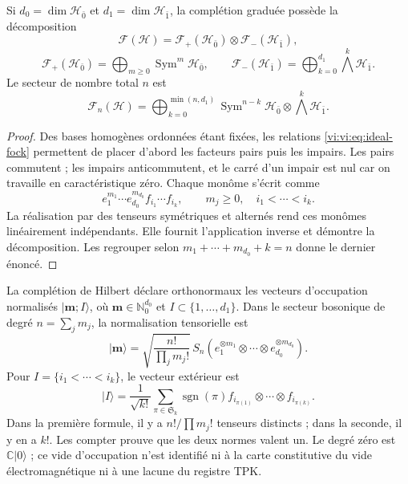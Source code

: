 \begin{theorem}
\label{vi:vi:thm:fock-graduado}
Si \(d_0=\dim\mathcal H_{\bar0}\) et
\(d_1=\dim\mathcal H_{\bar1}\), la complétion graduée possède
la décomposition
\begin{equation}
 \mathcal F(\mathcal H)=
 \mathcal F_+(\mathcal H_{\bar0})\otimes
 \mathcal F_-(\mathcal H_{\bar1}),
 \label{vi:vi:eq:fock-producto}
\end{equation}
\[
 \mathcal F_+(\mathcal H_{\bar0})=
 \bigoplus_{m\ge0}\operatorname{Sym}^m\mathcal H_{\bar0},
 \qquad
 \mathcal F_-(\mathcal H_{\bar1})=
 \bigoplus_{k=0}^{d_1}\bigwedge^k\mathcal H_{\bar1}.
\]
Le secteur de nombre total \(n\) est
\[
 \mathcal F_n(\mathcal H)=
 \bigoplus_{k=0}^{\min(n,d_1)}
 \operatorname{Sym}^{n-k}\mathcal H_{\bar0}
 \otimes\bigwedge^k\mathcal H_{\bar1}.
\]
\end{theorem}
\begin{proof}
Des bases homogènes ordonnées étant fixées, les relations
\eqref{vi:vi:eq:ideal-fock} permettent de placer d’abord les facteurs pairs
puis les impairs. Les pairs commutent ; les impairs anticommutent,
et le carré d’un impair est nul car on travaille en caractéristique
zéro. Chaque monôme s’écrit comme
\[
 e_1^{m_1}\cdots e_{d_0}^{m_{d_0}}
 f_{i_1}\cdots f_{i_k},
 \qquad m_j\ge0,\quad i_1<\cdots<i_k.
\]
La réalisation par des tenseurs symétriques et alternés rend
ces monômes linéairement indépendants. Elle fournit l’application
inverse et démontre la décomposition. Les regrouper selon
\(m_1+\cdots+m_{d_0}+k=n\) donne le dernier énoncé.
\end{proof}

La complétion de Hilbert déclare orthonormaux les vecteurs
d’occupation normalisés \(|\boldsymbol m;I\rangle\), où
\(\boldsymbol m\in\mathbb N_0^{d_0}\) et
\(I\subset\{1,\ldots,d_1\}\). Dans le secteur bosonique de degré
\(n=\sum_jm_j\), la normalisation tensorielle est
\[
 |\boldsymbol m\rangle=
 \sqrt{\frac{n!}{\prod_jm_j!}}\,
 S_n(e_1^{\otimes m_1}\otimes\cdots\otimes
 e_{d_0}^{\otimes m_{d_0}}).
\]
Pour \(I=\{i_1<\cdots<i_k\}\), le vecteur extérieur est
\[
 |I\rangle=\frac1{\sqrt{k!}}\sum_{\pi\in\mathfrak S_k}
 \operatorname{sgn}(\pi)
 f_{i_{\pi(1)}}\otimes\cdots\otimes f_{i_{\pi(k)}}.
\]
Dans la première formule, il y a \(n!/\prod m_j!\) tenseurs distincts ;
dans la seconde, il y en a \(k!\). Les compter prouve que les deux normes valent un.
Le degré zéro est \(\mathbb C|0\rangle\) ; ce vide d'occupation
n'est identifié ni à la carte constitutive du vide électromagnétique
ni à une lacune du registre TPK.

